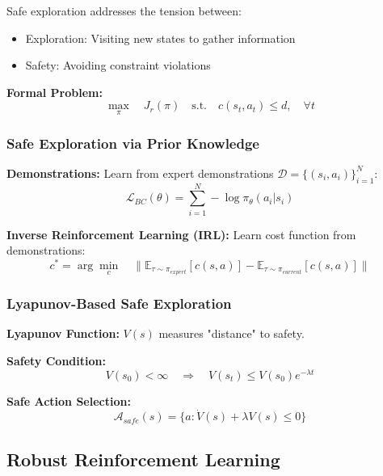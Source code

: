 \documentclass[12pt]{article}
\begin{document}
{{{{Safe exploration addresses the tension between:
\begin{itemize}
\item Exploration: Visiting new states to gather information
\item Safety: Avoiding constraint violations
\end{itemize}

\textbf{Formal Problem:}
\begin{equation}
\max_{\pi} \quad J_r(\pi) \quad \text{s.t.} \quad c(s_t, a_t) \leq d, \quad \forall t
\end{equation}

\subsubsection{Safe Exploration via Prior Knowledge}

\textbf{Demonstrations:} Learn from expert demonstrations $\mathcal{D} = \{(s_i, a_i)\}_{i=1}^N$:
\begin{equation}
\mathcal{L}_{BC}(\theta) = \sum_{i=1}^{N} -\log \pi_\theta(a_i|s_i)
\end{equation}

\textbf{Inverse Reinforcement Learning (IRL):} Learn cost function from demonstrations:
\begin{equation}
c^* = \arg\min_c \quad \|\mathbb{E}_{\tau \sim \pi_{expert}}[c(s,a)] - \mathbb{E}_{\tau \sim \pi_{current}}[c(s,a)]\|
\end{equation}

\subsubsection{Lyapunov-Based Safe Exploration}

\textbf{Lyapunov Function:} $V(s)$ measures "distance" to safety.

\textbf{Safety Condition:}
\begin{equation}
V(s_0) < \infty \quad \Rightarrow \quad V(s_t) \leq V(s_0) e^{-\lambda t}
\end{equation}

\textbf{Safe Action Selection:}
\begin{equation}
\mathcal{A}_{safe}(s) = \{a : \dot{V}(s) + \lambda V(s) \leq 0\}
\end{equation}

\subsection{Robust Reinforcement Learning}

}}}}
\end{document}
